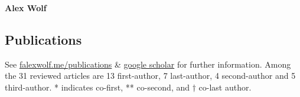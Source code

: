 \documentclass[11pt]{scrartcl}
\def\newline{\\[.4em]}
\begin{document}
\thispagestyle{firstpage}
\pagestyle{fancy}
\vspace*{1em}
\begin{center}\textbf{\LARGE{Alex Wolf}}\end{center}


\setlength\LTleft{0em}
\subsection*{Publications}
See \href{https://falexwolf.me/publications}{falexwolf.me/publications} \& \href{http://scholar.google.de/citations?user=1FnOtMoAAAAJ\&hl=en}{google scholar} for further information. Among the 31 reviewed articles are 13 first-author, 7 last-author, 4 second-author and 5 third-author. * indicates co-first, ** co-second, and $\dagger$ co-last author.
\def\newline{\\[.6em]}


\newpage
\vspace{0em}

\end{document}
